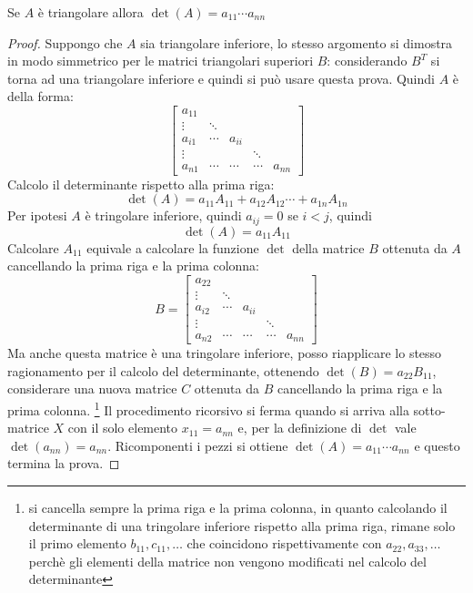 \begin{exercise}
\label{exercise:triangularMatrixDet}
Se $A$ \`e triangolare allora $\det(A) = a_{11} \cdots a_{nn}$
\end{exercise}
\begin{proof}
Suppongo che $A$ sia triangolare inferiore, lo stesso argomento si dimostra in
modo simmetrico per le matrici triangolari superiori $B$: considerando $B^{T}$
si torna ad una triangolare inferiore e quindi si pu\`o usare questa prova.
Quindi $A$ \`e della forma:
\begin{displaymath}
\begin{bmatrix}
a_{11} \\
\vdots & \ddots \\
a_{i1} & \cdots & a_{ii} \\
\vdots & 		&		& \ddots\\
a_{n1} & \cdots & \cdots &\cdots & a_{nn}
\end{bmatrix}
\end{displaymath}
Calcolo il determinante rispetto alla prima riga:
\begin{displaymath}
\det(A) = a_{11}A_{11} + a_{12}A_{12}\cdots + a_{1n}A_{1n}
\end{displaymath}
Per ipotesi $A$ \`e tringolare inferiore, quindi $a_{ij} = 0$ se $i < j$, quindi
\begin{displaymath}
\det(A) = a_{11}A_{11}
\end{displaymath}
Calcolare $A_{11}$ equivale a calcolare la funzione $\det$ della matrice
$B$ ottenuta da $A$ cancellando la prima riga e la prima colonna:
\begin{displaymath}
B = \begin{bmatrix}
a_{22} \\
\vdots & \ddots \\
a_{i2} & \cdots & a_{ii} \\
\vdots & 		&		& \ddots\\
a_{n2} & \cdots & \cdots &\cdots & a_{nn}
\end{bmatrix}
\end{displaymath}
Ma anche questa matrice \`e una tringolare inferiore, posso riapplicare lo
stesso ragionamento per il calcolo del determinante, ottenendo $\det(B) =
a_{22}B_{11}$, considerare una nuova matrice $C$ ottenuta da $B$ cancellando la
prima riga e la prima colonna. \footnote{si cancella sempre la prima riga e la
prima colonna, in quanto calcolando il determinante di una tringolare inferiore
rispetto alla prima riga, rimane solo il primo elemento $b_{11}, c_{11}, \ldots$
che coincidono rispettivamente con $a_{22}, a_{33}, \ldots$ perch\`e gli
elementi della matrice non vengono modificati nel calcolo del determinante}
Il procedimento ricorsivo si ferma quando si arriva alla sotto-matrice $X$ con
il solo elemento $x_{11} = a_{nn}$ e, per la definizione di $\det$ vale
$\det(a_{nn}) = a_{nn}$. Ricomponenti i pezzi si ottiene $\det(A) = a_{11}
\cdots a_{nn}$ e questo termina la prova.
\end{proof}

